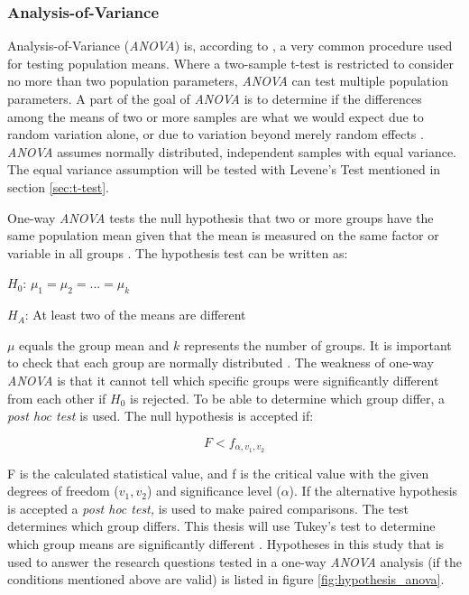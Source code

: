 \subsubsection[ANOVA]{Analysis-of-Variance}\label{sec:anova}
Analysis-of-Variance (\textit{ANOVA}) is, according to \cite{Walpole2012}, a very common procedure used for testing population means. Where a two-sample t-test is restricted to consider no more than two population parameters, \textit{ANOVA} can test multiple population parameters. A part of the goal of \textit{ANOVA} is to determine if the differences among the means of two or more samples are what we would expect due to random variation alone, or due to variation beyond merely random effects \citep{Walpole2012}. \textit{ANOVA} assumes normally distributed, independent samples with equal variance. The equal variance assumption will be tested with Levene's Test mentioned in section \ref{sec:t-test}. 

One-way \textit{ANOVA} tests the null hypothesis that two or more groups have the same population mean given that the mean is measured on the same factor or variable in all groups \citep{LundResearchLtd2013a}. The hypothesis test can be written as:\newline

\centerline{$H_{0}$:  $\mu_{1} =  \mu_{2} = ... = \mu_{k} $} 
\centerline{$H_{A}$:  At least two of the means are different}

$\mu$ equals the group mean and $k$ represents the number of groups. It is important to check that each group are normally distributed \citep{LundResearchLtd2013a}. The weakness of one-way \textit{ANOVA} is that it cannot tell which specific groups were significantly different from each other if $H_{0}$ is rejected. To be able to determine which group differ, a \textit{post hoc test} is used. The null hypothesis is accepted if:

\begin{equation}
\label{eq:anova_reject}
F < f_{\alpha, v_{1}, v_{2}}
\end{equation}

F is the calculated statistical value, and f is the critical value with the given degrees of freedom ($v_{1}, v_{2}$) and significance level ($\alpha$). If the alternative hypothesis is accepted a \textit{post hoc test,} is used to make paired comparisons. The test determines which group differs. This thesis will use Tukey's test to determine which group means are significantly different \citep[p.~526]{Walpole2012}. Hypotheses in this study that is used to answer the research questions tested in a one-way \textit{ANOVA} analysis (if the conditions mentioned above are valid) is listed in figure \ref{fig:hypothesis_anova}. 

